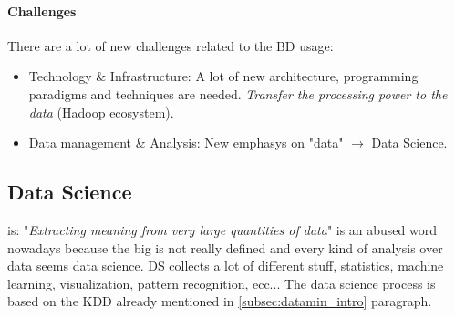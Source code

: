 \documentclass[12pt]{article}
\begin{document}
\paragraph{Challenges} There are a lot of new challenges related to the BD usage:
\begin{itemize}
  \item Technology \& Infrastructure: A lot of new architecture, programming paradigms and techniques are needed. \textit{Transfer the processing power to the data} (Hadoop ecosystem).
  \item Data management \& Analysis: New emphasys on "data" $\rightarrow$ Data Science.
\end{itemize}

\subsection{Data Science} is: "\textit{Extracting meaning from very large quantities of data}" is an abused word nowadays because the big is not really defined and every kind of analysis over data seems data science. DS collects a lot of different stuff, statistics, machine learning, visualization, pattern recognition, ecc... The data science process is based on the KDD already mentioned in \ref{subsec:datamin_intro} paragraph.
\end{document}
